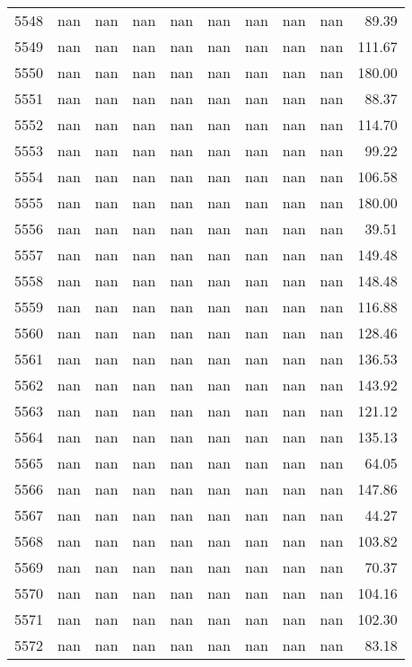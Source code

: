\begin{tabular}{lrrrrrrrrr}
5548 & nan & nan & nan & nan & nan & nan & nan & nan & 89.39 \\
5549 & nan & nan & nan & nan & nan & nan & nan & nan & 111.67 \\
5550 & nan & nan & nan & nan & nan & nan & nan & nan & 180.00 \\
5551 & nan & nan & nan & nan & nan & nan & nan & nan & 88.37 \\
5552 & nan & nan & nan & nan & nan & nan & nan & nan & 114.70 \\
5553 & nan & nan & nan & nan & nan & nan & nan & nan & 99.22 \\
5554 & nan & nan & nan & nan & nan & nan & nan & nan & 106.58 \\
5555 & nan & nan & nan & nan & nan & nan & nan & nan & 180.00 \\
5556 & nan & nan & nan & nan & nan & nan & nan & nan & 39.51 \\
5557 & nan & nan & nan & nan & nan & nan & nan & nan & 149.48 \\
5558 & nan & nan & nan & nan & nan & nan & nan & nan & 148.48 \\
5559 & nan & nan & nan & nan & nan & nan & nan & nan & 116.88 \\
5560 & nan & nan & nan & nan & nan & nan & nan & nan & 128.46 \\
5561 & nan & nan & nan & nan & nan & nan & nan & nan & 136.53 \\
5562 & nan & nan & nan & nan & nan & nan & nan & nan & 143.92 \\
5563 & nan & nan & nan & nan & nan & nan & nan & nan & 121.12 \\
5564 & nan & nan & nan & nan & nan & nan & nan & nan & 135.13 \\
5565 & nan & nan & nan & nan & nan & nan & nan & nan & 64.05 \\
5566 & nan & nan & nan & nan & nan & nan & nan & nan & 147.86 \\
5567 & nan & nan & nan & nan & nan & nan & nan & nan & 44.27 \\
5568 & nan & nan & nan & nan & nan & nan & nan & nan & 103.82 \\
5569 & nan & nan & nan & nan & nan & nan & nan & nan & 70.37 \\
5570 & nan & nan & nan & nan & nan & nan & nan & nan & 104.16 \\
5571 & nan & nan & nan & nan & nan & nan & nan & nan & 102.30 \\
5572 & nan & nan & nan & nan & nan & nan & nan & nan & 83.18 \\

\end{tabular}
